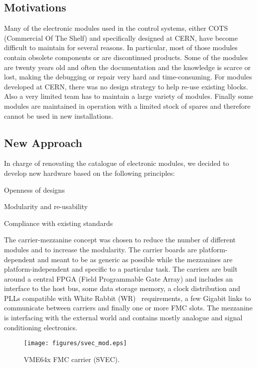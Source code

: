 \documentclass{JAC2003}
\begin{document}
\subsection{Motivations}
Many of the electronic modules used in the control systems, either COTS (Commercial Of The Shelf) and specifically designed at CERN, have become difficult to maintain for several reasons.
In particular, most of those modules contain obsolete components or are discontinued products.
Some of the modules are twenty years old and often the documentation and the knowledge is scarce or lost, making the debugging or repair very hard and time-consuming.
For modules developed at CERN, there was no design strategy to help re-use existing blocks.
Also a very limited team has to maintain a large variety of modules.
Finally some modules are maintained in operation with a limited stock of spares and therefore cannot be used in new installations.

\subsection{New Approach}
In charge of renovating the catalogue of electronic modules, we decided to develop new hardware based on the following principles:
\begin{Itemize}
\item Openness of designs
\item Modularity and re-usability
\item Compliance with existing standards
\end{Itemize}

The carrier-mezzanine concept was chosen to reduce the number of different modules and to increase the modularity.
The carrier boards are platform-dependent and meant to be as generic as possible while the mezzanines are platform-independent and specific to a particular task.
The carriers are built around a central FPGA (Field Programmable Gate Array) and includes an interface to the host bus, some data storage memory, a clock distribution and PLLs compatible with White Rabbit (WR)~\cite{wr} requirements, a few Gigabit links to communicate between carriers and finally one or more FMC slots.
The mezzanine is interfacing with the external world and contains mostly analogue and signal conditioning electronics.

\begin{figure}[htb]
   \centering
   \texttt{[image: figures/svec\_mod.eps]}
   \caption{VME64x FMC carrier (SVEC).}
   \label{svec}
\end{figure}
\end{document}
